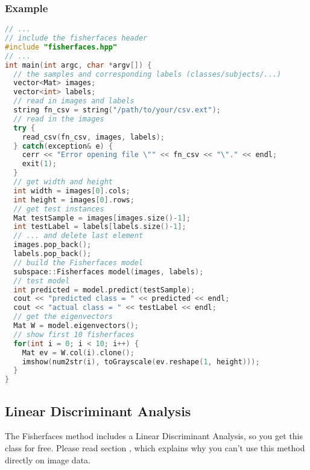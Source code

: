 \subsubsection{Example}
\begin{lstlisting}[language=c++]
// ...
// include the fisherfaces header
#include "fisherfaces.hpp"
// ...
int main(int argc, char *argv[]) {
  // the samples and corresponding labels (classes/subjects/...)
  vector<Mat> images;
  vector<int> labels;
  // read in images and labels
  string fn_csv = string("/path/to/your/csv.ext");
  // read in the images
  try {
    read_csv(fn_csv, images, labels);
  } catch(exception& e) {
    cerr << "Error opening file \"" << fn_csv << "\"." << endl;
    exit(1);
  }
  // get width and height
  int width = images[0].cols;
  int height = images[0].rows;
  // get test instances
  Mat testSample = images[images.size()-1];
  int testLabel = labels[labels.size()-1];
  // ... and delete last element
  images.pop_back();
  labels.pop_back();
  // build the Fisherfaces model
  subspace::Fisherfaces model(images, labels);
  // test model
  int predicted = model.predict(testSample);
  cout << "predicted class = " << predicted << endl;
  cout << "actual class = " << testLabel << endl;
  // get the eigenvectors
  Mat W = model.eigenvectors();
  // show first 10 fisherfaces
  for(int i = 0; i < 10; i++) {
    Mat ev = W.col(i).clone();
    imshow(num2str(i), toGrayscale(ev.reshape(1, height)));
  }
}
\end{lstlisting}

\subsection{Linear Discriminant Analysis}
The Fisherfaces method includes a Linear Discriminant Analysis, so you get this class for free. Please read section \label{ssection:fisherfaces}, which explains why you can't use this method directly on image data.

